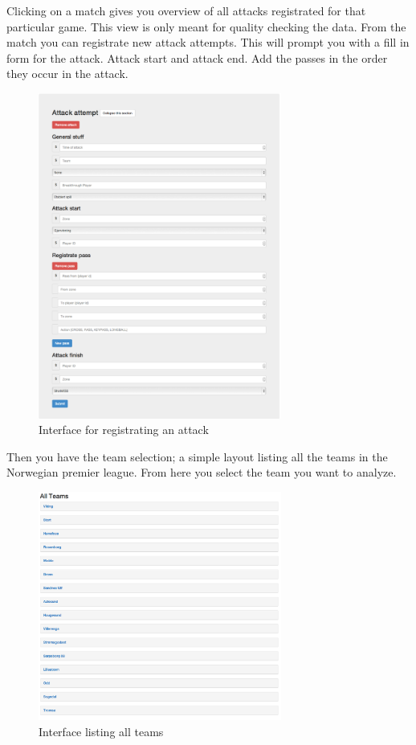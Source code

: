 Clicking on a match gives you overview of all attacks registrated for that particular game. This view is only meant for quality checking the data.
From the match you can registrate new attack attempts. This will prompt you with a fill in form for the attack. Attack start and attack end. Add the passes in the order they occur in the attack. 

\begin{figure}[ht!]
\centering
\includegraphics[width=80mm]{images/general/reg_attack.png}
\caption{Interface for registrating an attack}
\label{overflow}
\end{figure}

Then you have the team selection; a simple layout listing all the teams in the Norwegian premier league. From here you select the team you want to analyze.

\begin{figure}[ht!]
\centering
\includegraphics[width=80mm]{images/general/all_teams.png}
\caption{Interface listing all teams}
\label{overflow}
\end{figure}


